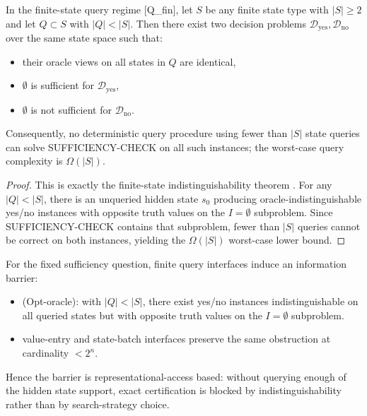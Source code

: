 \begin{proposition}\label{prop:query-regime-obstruction}
In the finite-state query regime [Q\_fin], let $S$ be any finite state type with $|S|\ge 2$ and let $Q\subset S$ with $|Q|<|S|$.
Then there exist two decision problems $\mathcal{D}_{\mathrm{yes}},\mathcal{D}_{\mathrm{no}}$ over the same state space such that:
\begin{itemize}
\item their oracle views on all states in $Q$ are identical,
\item $\emptyset$ is sufficient for $\mathcal{D}_{\mathrm{yes}}$,
\item $\emptyset$ is not sufficient for $\mathcal{D}_{\mathrm{no}}$.
\end{itemize}
Consequently, no deterministic query procedure using fewer than $|S|$ state queries can solve SUFFICIENCY-CHECK on all such instances; the worst-case query complexity is $\Omega(|S|)$.
\end{proposition}

\begin{proof}
This is exactly the finite-state indistinguishability theorem
. For any $|Q|<|S|$, there is an unqueried hidden state $s_0$ producing oracle-indistinguishable yes/no instances with opposite truth values on the $I=\emptyset$ subproblem. Since SUFFICIENCY-CHECK contains that subproblem, fewer than $|S|$ queries cannot be correct on both instances, yielding the $\Omega(|S|)$ worst-case lower bound.
\end{proof}

\begin{corollary}\label{cor:information-barrier-query}
For the fixed sufficiency question, finite query interfaces induce an information barrier:
\begin{itemize}
\item [Q\_fin] (Opt-oracle): with $|Q|<|S|$, there exist yes/no instances indistinguishable on all queried states but with opposite truth values on the $I=\emptyset$ subproblem.
\item [Q\_bool] value-entry and state-batch interfaces preserve the same obstruction at cardinality $<2^n$.
\end{itemize}
Hence the barrier is representational-access based: without querying enough of the hidden state support, exact certification is blocked by indistinguishability rather than by search-strategy choice.
\end{corollary}

